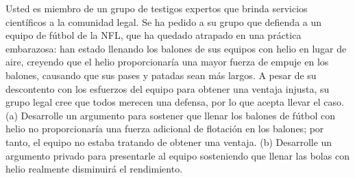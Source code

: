 \item Usted es miembro de un grupo de testigos expertos que brinda servicios científicos a la comunidad legal. Se ha pedido a su grupo que defienda a un equipo de fútbol de la NFL, que ha quedado atrapado en una práctica embarazosa: han estado llenando los balones de sus equipos con helio en lugar de aire, creyendo que el helio proporcionaría una mayor fuerza de empuje en los balones, causando que sus pases y patadas sean más largos. A pesar de su descontento con los esfuerzos del equipo para obtener una ventaja injusta, su grupo legal cree que todos merecen una defensa, por lo que acepta llevar el caso. (a) Desarrolle un argumento para sostener que llenar los balones de fútbol con helio no proporcionaría una fuerza adicional de flotación en los balones; por tanto, el equipo no estaba tratando de obtener una ventaja. (b) Desarrolle un argumento privado para presentarle al equipo sosteniendo que llenar las bolas con helio realmente disminuirá el rendimiento.

